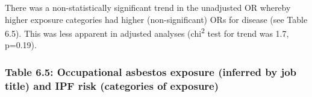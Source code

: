 There was a non-statistically significant trend in the unadjusted OR
whereby higher exposure categories had higher (non-significant) ORs for
disease (see Table 6.5). This was less apparent in adjusted analyses
(chi\textsuperscript{2} test for trend was 1.7, p=0.19).

\newpage

\hypertarget{table-6.5-occupational-asbestos-exposure-inferred-by-job-title-and-ipf-risk-categories-of-exposure}{%
\subsubsection{Table 6.5: Occupational asbestos exposure (inferred by
job title) and IPF risk (categories of
exposure)}\label{table-6.5-occupational-asbestos-exposure-inferred-by-job-title-and-ipf-risk-categories-of-exposure}}

